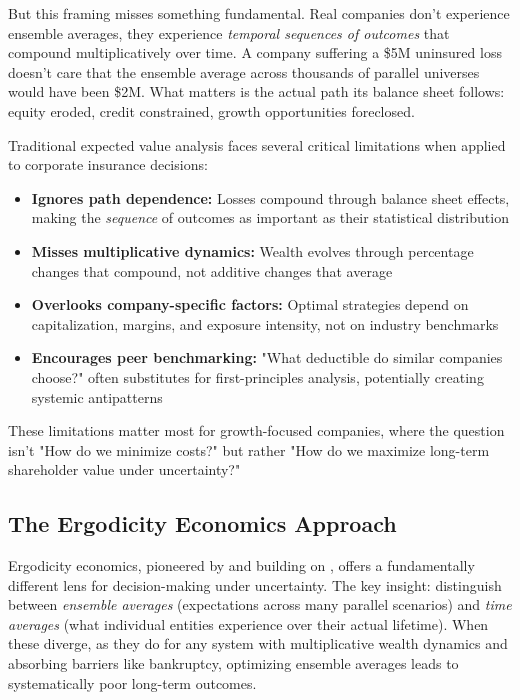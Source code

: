 \documentclass[11pt,letterpaper]{article}
\begin{document}
But this framing misses something fundamental. Real companies don't experience ensemble averages, they experience \emph{temporal sequences of outcomes} that compound multiplicatively over time. A company suffering a \$5M uninsured loss doesn't care that the ensemble average across thousands of parallel universes would have been \$2M. What matters is the actual path its balance sheet follows: equity eroded, credit constrained, growth opportunities foreclosed.

Traditional expected value analysis faces several critical limitations when applied to corporate insurance decisions:
\begin{itemize}
    \item \textbf{Ignores path dependence:} Losses compound through balance sheet effects, making the \emph{sequence} of outcomes as important as their statistical distribution
    \item \textbf{Misses multiplicative dynamics:} Wealth evolves through percentage changes that compound, not additive changes that average
    \item \textbf{Overlooks company-specific factors:} Optimal strategies depend on capitalization, margins, and exposure intensity, not on industry benchmarks
    \item \textbf{Encourages peer benchmarking:} "What deductible do similar companies choose?" often substitutes for first-principles analysis, potentially creating systemic antipatterns
\end{itemize}

These limitations matter most for growth-focused companies, where the question isn't "How do we minimize costs?" but rather "How do we maximize long-term shareholder value under uncertainty?"

\subsection{The Ergodicity Economics Approach}

Ergodicity economics, pioneered by \citet{peters2019ergodicity} and building on \citet{kelly1956new}, offers a fundamentally different lens for decision-making under uncertainty. The key insight: distinguish between \emph{ensemble averages} (expectations across many parallel scenarios) and \emph{time averages} (what individual entities experience over their actual lifetime). When these diverge, as they do for any system with multiplicative wealth dynamics and absorbing barriers like bankruptcy, optimizing ensemble averages leads to systematically poor long-term outcomes.
\end{document}

